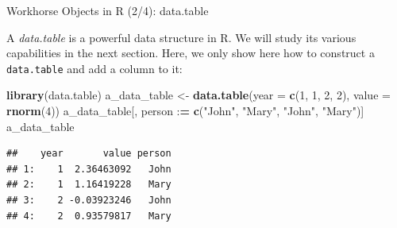 \documentclass[10pt,ignorenonframetext,]{beamer}
\newenvironment{Shaded}{\begin{snugshade}}{\end{snugshade}}
\newcommand{\KeywordTok}[1]{\textcolor[rgb]{0.13,0.29,0.53}{\textbf{{#1}}}}
\newcommand{\DataTypeTok}[1]{\textcolor[rgb]{0.13,0.29,0.53}{{#1}}}
\newcommand{\DecValTok}[1]{\textcolor[rgb]{0.00,0.00,0.81}{{#1}}}
\newcommand{\StringTok}[1]{\textcolor[rgb]{0.31,0.60,0.02}{{#1}}}
\newcommand{\ErrorTok}[1]{\textcolor[rgb]{0.64,0.00,0.00}{\textbf{{#1}}}}
\newcommand{\NormalTok}[1]{{#1}}
\begin{document}
\begin{frame}[fragile]{Workhorse Objects in R (2/4): data.table}

A \emph{data.table} is a powerful data structure in R. We will study its
various capabilities in the next section. Here, we only show here how to
construct a \texttt{data.table} and add a column to it:

\footnotesize

\begin{Shaded}
\begin{Highlighting}[]
\KeywordTok{library}\NormalTok{(data.table)}
\NormalTok{a_data_table <-}\StringTok{ }\KeywordTok{data.table}\NormalTok{(}\DataTypeTok{year =} \KeywordTok{c}\NormalTok{(}\DecValTok{1}\NormalTok{, }\DecValTok{1}\NormalTok{, }\DecValTok{2}\NormalTok{, }\DecValTok{2}\NormalTok{), }\DataTypeTok{value =} \KeywordTok{rnorm}\NormalTok{(}\DecValTok{4}\NormalTok{))}
\NormalTok{a_data_table[, person :}\ErrorTok{=}\StringTok{ }\KeywordTok{c}\NormalTok{(}\StringTok{"John"}\NormalTok{, }\StringTok{"Mary"}\NormalTok{, }\StringTok{"John"}\NormalTok{, }\StringTok{"Mary"}\NormalTok{)]}
\NormalTok{a_data_table}
\end{Highlighting}
\end{Shaded}

\begin{verbatim}
##    year       value person
## 1:    1  2.36463092   John
## 2:    1  1.16419228   Mary
## 3:    2 -0.03923246   John
## 4:    2  0.93579817   Mary
\end{verbatim}

\normalsize

\end{frame}
\end{document}

